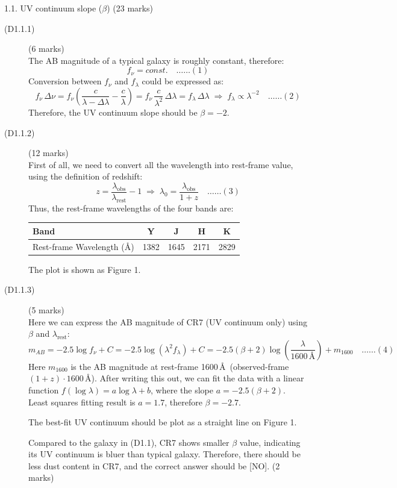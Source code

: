 1.1. UV continuum slope ($\beta$) \hfill(23 marks)

\begin{description}
\item[(D1.1.1)] \hfill(6 marks)\\
  The AB magnitude of a typical galaxy is roughly constant, therefore:
  \[ f_\nu = \mathit{const.} \quad\ldots\ldots(1) \]
  Conversion between $f_\nu$ and $f_\lambda$ could be expressed as:
  \[ f_\nu\,\Delta\nu = f_\nu\left(\frac{c}{\lambda-\Delta\lambda}
     - \frac{c}{\lambda}\right)
     = f_\nu\,\frac{c}{\lambda^2}\,\Delta\lambda = f_\lambda\,\Delta\lambda
     \;\Rightarrow\; f_\lambda \propto \lambda^{-2} \quad\ldots\ldots(2) \]
  Therefore, the UV continuum slope should be $\beta = -2$.

\item[(D1.1.2)] \hfill(12 marks)\\
  First of all, we need to convert all the wavelength into rest-frame value,
  using the definition of redshift:
  \[ z = \frac{\lambda_{\mathrm{obs}}}{\lambda_{\mathrm{rest}}} - 1
     \;\Rightarrow\;
     \lambda_0 = \frac{\lambda_{\mathrm{obs}}}{1+z} \quad\ldots\ldots(3) \]
  Thus, the rest-frame wavelengths of the four bands are:

  \begin{center}
  \begin{tabular}{lcccc}
    Band & Y & J & H & K \\
    \hline
    Rest-frame Wavelength (\AA) & 1382 & 1645 & 2171 & 2829 \\
  \end{tabular}
  \end{center}

  The plot is shown as Figure 1.

\item[(D1.1.3)] \hfill(5 marks)\\
  Here we can express the AB magnitude of CR7 (UV continuum only) using
  $\beta$ and $\lambda_{\mathrm{rest}}$:
  \[ m_{AB} = -2.5\log f_\nu + C = -2.5\log(\lambda^2 f_\lambda) + C
     = -2.5(\beta+2)\log\!\left(\frac{\lambda}{1600\,\text{\AA}}\right)
       + m_{1600} \quad\ldots\ldots(4) \]
  Here $m_{1600}$ is the AB magnitude at rest-frame 1600\,\AA\
  (observed-frame $(1+z)\cdot 1600$\,\AA). After writing this out, we can fit
  the data with a linear function $f(\log\lambda) = a\log\lambda + b$, where
  the slope $a = -2.5(\beta+2)$. Least squares fitting result is $a = 1.7$,
  therefore $\beta = -2.7$.

  The best-fit UV continuum should be plot as a straight line on Figure 1.

  Compared to the galaxy in (D1.1), CR7 shows smaller $\beta$ value,
  indicating its UV continuum is bluer than typical galaxy. Therefore, there
  should be less dust content in CR7, and the correct answer should be [NO].
  \hfill(2 marks)
\end{description}

